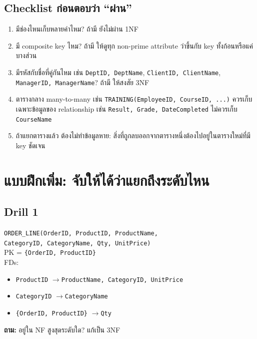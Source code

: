 \documentclass[a4paper,12pt]{article}
\newcommand{\fd}{\(\rightarrow\)}
\newcommand{\schema}[1]{\texttt{#1}}
\begin{document}
\subsection*{Checklist ก่อนตอบว่า ``ผ่าน''}
\begin{enumerate}[label=\textbf{\arabic*.}]
    \item มีช่องไหนเก็บหลายค่าไหม? ถ้ามี ยังไม่ผ่าน 1NF
    \item มี composite key ไหม? ถ้ามี ให้ดูทุก non-prime attribute ว่าขึ้นกับ key ทั้งก้อนหรือแค่บางส่วน
    \item มีรหัสกับชื่อที่คู่กันไหม เช่น \schema{DeptID, DeptName}, \schema{ClientID, ClientName}, \schema{ManagerID, ManagerName}? ถ้ามี ให้สงสัย 3NF
    \item ตารางกลาง many-to-many เช่น \schema{TRAINING(EmployeeID, CourseID, ...)} ควรเก็บเฉพาะข้อมูลของ relationship เช่น \schema{Result, Grade, DateCompleted} ไม่ควรเก็บ \schema{CourseName}
    \item ถ้าแยกตารางแล้ว ต้องไม่ทำข้อมูลหาย: สิ่งที่ถูกลบออกจากตารางหนึ่งต้องไปอยู่ในตารางใหม่ที่มี key ชัดเจน
\end{enumerate}

\section*{แบบฝึกเพิ่ม: จับให้ได้ว่าแยกถึงระดับไหน}

\subsection*{Drill 1}
\schema{ORDER\_LINE(OrderID, ProductID, ProductName,}\\
\schema{CategoryID, CategoryName, Qty, UnitPrice)}\\
PK = \schema{\{OrderID, ProductID\}}\\
FDs:
\begin{itemize}
    \item \schema{ProductID} \fd \schema{ProductName, CategoryID, UnitPrice}
    \item \schema{CategoryID} \fd \schema{CategoryName}
    \item \schema{\{OrderID, ProductID\}} \fd \schema{Qty}
\end{itemize}

\textbf{ถาม:} อยู่ใน NF สูงสุดระดับใด? แก้เป็น 3NF
\vspace{3.8cm}
\end{document}
